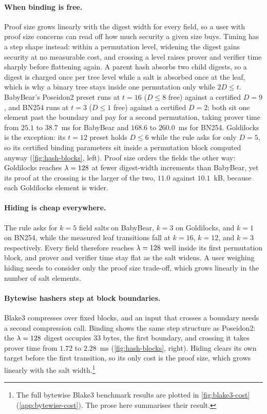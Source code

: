 \paragraph{When binding is free.}
Proof size grows linearly with the digest width for every field, so a user with proof size
concerns can read off how much security a given size buys.  Timing has a step shape
instead: within a permutation level, widening the digest gains security at no measurable
cost, and crossing a level raises prover and verifier time sharply before flattening again.
A parent hash absorbs two child digests, so a digest is charged once per tree level while a
salt is absorbed once at the leaf, which is why a binary tree stays inside one permutation
only while $2D\le t$.  BabyBear's Poseidon2 preset runs at $t=16$ ($D\le8$ free) against a
certified $D=9$, and BN254 runs at $t=3$ ($D\le1$ free) against a certified $D=2$: both sit
one element past the boundary and pay for a second permutation, taking prover time from
$25.1$ to $38.7$~ms for BabyBear and $168.6$ to $260.0$~ms for BN254.  Goldilocks is the
exception: its $t=12$ preset holds $D\le6$ while the rule asks for only $D=5$, so its
certified binding parameters sit inside a permutation block computed anyway
(\cref{fig:hash-blocks}, left).  Proof size orders the fields the other way: Goldilocks
reaches $\lambda=128$ at fewer digest-width increments than BabyBear, yet its proof at the
crossing is the larger of the two, $11.0$ against $10.1$~kB, because each Goldilocks
element is wider.

\paragraph{Hiding is cheap everywhere.}
The rule asks for $k=5$ field salts on BabyBear, $k=3$ on Goldilocks, and $k=1$ on BN254,
while the measured leaf transitions fall at $k=16$, $k=12$, and $k=3$ respectively.  Every
field therefore reaches $\lambda=128$ well inside its first permutation block, and prover
and verifier time stay flat as the salt widens.  A user weighing hiding needs to consider
only the proof size trade-off, which grows linearly in the number of salt elements.

\paragraph{Bytewise hashers step at block boundaries.}
Blake3 compresses over fixed blocks, and an input that crosses a boundary needs a second
compression call.  Binding shows the same step structure as Poseidon2: the $\lambda=128$
digest occupies $33$ bytes, the first boundary, and crossing it takes prover time from
$1.72$ to $2.28$~ms (\cref{fig:hash-blocks}, right).  Hiding clears its own target before
the first transition, so its only cost is the proof size, which grows linearly with the
salt width.\footnote{The full bytewise Blake3 benchmark results are plotted in
\cref{fig:blake3-cost} (\cref{app:bytewise-cost}).  The prose here summarises their
result.}
